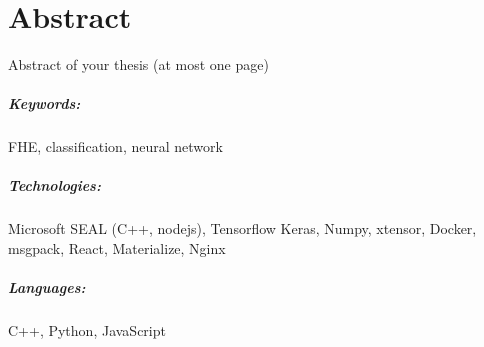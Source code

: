 \chapter*{Abstract}
Abstract of your thesis (at most one page)

\lipsum[1-3]

\paragraph{Keywords:}
FHE, classification, neural network

\paragraph{Technologies:}
Microsoft SEAL (C++, nodejs),
Tensorflow Keras,
Numpy,
xtensor,
Docker,
msgpack,
React,
Materialize,
Nginx

\paragraph{Languages:}
C++, Python, JavaScript
